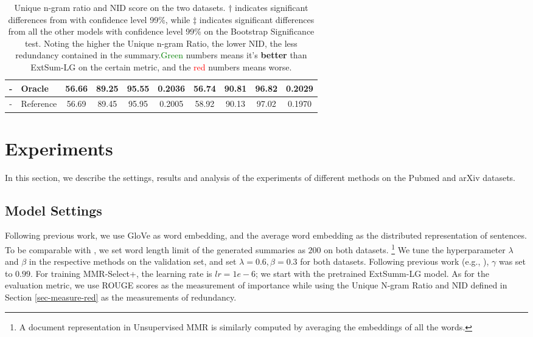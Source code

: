 \documentclass[11pt,a4paper]{article}
\begin{document}
\begin{table*}[h!]
{\begin{tabular}{c|l|c|c|c|c|c|c|c|c}
        \hline
-&        Oracle &56.66 &89.25 & 95.55&0.2036& 56.74 &90.81 & 96.82&0.2029\\
        \hline
-&        Reference&56.69 & 89.45&95.95 &0.2005&58.92 & 90.13& 97.02 &0.1970\\
        \hline
    \end{tabular}}
    \caption{Unique n-gram ratio and NID score on the two datasets. $\dagger$ indicates significant differences from \cite{xiao-carenini-2019-extractive} with confidence level 99\%, while $\ddagger$ indicates significant differences from all the other models with confidence level 99\% on the Bootstrap Significance test. Noting the higher the Unique n-gram Ratio, the lower NID, the less redundancy contained in the summary.\textcolor{Green}{Green} numbers means it's \textbf{better }than ExtSum-LG on the certain metric, and the \textcolor{Red}{red} numbers means worse.}
    \label{tab:redundancy}
    \vspace{-2mm}
\end{table*}
\vspace{-1mm}
\section{Experiments}
In this section, we describe the settings, results and analysis of the experiments of different methods on the Pubmed and arXiv datasets.
\vspace{-1mm}
\subsection{Model Settings}


Following previous work, we use GloVe \cite{glove} as word embedding, and the average word embedding as the distributed representation of sentences. To be comparable with \citet{xiao-carenini-2019-extractive}, we set word length limit of the generated summaries as $200$ on both datasets.  \footnote{A document representation in Unsupervised MMR is similarly computed by averaging the embeddings of all the words.}
We tune the hyperparameter $\lambda$ and $\beta$ in the respective methods on the validation set, and set $\lambda=0.6, \beta=0.3$ for both datasets. Following previous work (e.g., \citet{bertrl}), $\gamma$ was set to $0.99$. For training MMR-Select+, the learning rate is $lr=1e-6$; we start with the pretrained ExtSumm-LG model. As for the evaluation metric, we use ROUGE scores as the measurement of importance while using the Unique N-gram Ratio and NID defined in Section \ref{sec-measure-red} as the measurements of redundancy.
\vspace{-1mm}
\end{document}
